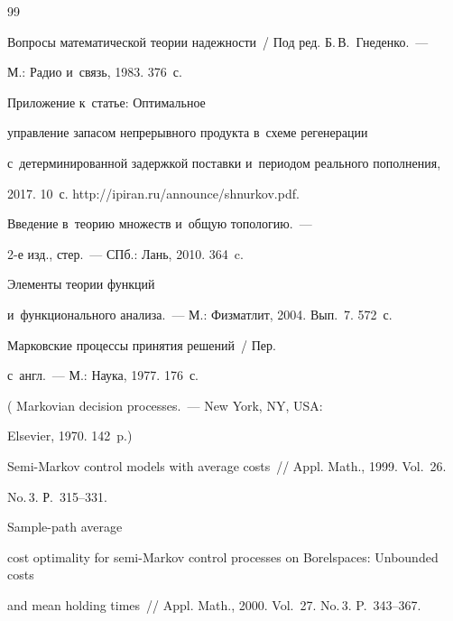 {{\begin{thebibliography}{99}

Вопросы математической теории надежности~/ Под ред. Б.\,В.~Гнеденко.~--- 

М.: Радио и~связь, 1983. 376~с.


 Приложение к~статье: Оптимальное 

управ\-ле\-ние запасом непрерывного продукта в~схеме регенерации 

с~детерминированной задержкой поставки и~периодом реального пополнения, 

2017. 10~с. {\sf http://ipiran.ru/announce/shnurkov.pdf}.


 Введение в~теорию множеств и~общую топологию.~--- 

2-е изд., стер.~--- СПб.: Лань, 2010. 364~c.


 Элементы теории функций 

и~функционального анализа.~--- М.: Физматлит, 2004. Вып.~7. 572~с.


 Марковские процессы принятия решений~/ Пер. 

с~англ.~--- М.: Наука, 1977. 176~с.

( Markovian decision processes.~--- New York, NY, USA: 

Elsevier, 1970. 142~p.)



Semi-Markov control models with average costs~/\!\!/ Appl. Math., 1999. Vol.~26. 

No.\,3. Р.~315--331.


 Sample-path average 

cost optimality for semi-Markov control processes on Borelspaces: Unbounded costs 

and mean holding times~/\!\!/ Appl. Math., 2000. Vol.~27. No.\,3. P.~343--367.



        \end{thebibliography}

} }





